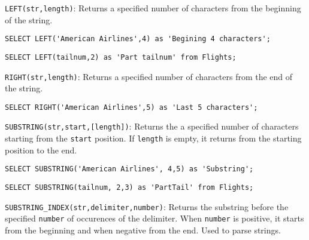 \documentclass{article}
\begin{document}
\begin{outline}

   \1 \texttt{LEFT(str,length)}: Returns a specified number of characters from the beginning of the  string.
        
         
\begin{lstlisting}[frame=single]  
SELECT LEFT('American Airlines',4) as 'Begining 4 characters';
\end{lstlisting}

        
\begin{lstlisting}[frame=single]  
SELECT LEFT(tailnum,2) as 'Part tailnum' from Flights;
\end{lstlisting}

         
         
         
         
         
   \1 \texttt{RIGHT(str,length)}: Returns a specified number of characters
from the end of the  string.

       
\begin{lstlisting}[frame=single]  
SELECT RIGHT('American Airlines',5) as 'Last 5 characters';
\end{lstlisting}





      
   \1 \texttt{SUBSTRING(str,start,[length])}: Returns the a specified number of characters starting from the \texttt{start} position.  If \texttt{length} is empty, it returns from the starting position to the end.    
       
\begin{lstlisting}[frame=single]  
SELECT SUBSTRING('American Airlines', 4,5) as 'Substring';
\end{lstlisting}


       
\begin{lstlisting}[frame=single]  
SELECT SUBSTRING(tailnum, 2,3) as 'PartTail' from Flights;
\end{lstlisting}

       

  
  
  
  
  
  
  
      
   \1 \texttt{SUBSTRING\_INDEX(str,delimiter,number)}: Returns  the substring before the specified \texttt{number} of occurences of the delimiter.  When \texttt{number} is positive, it starts from the beginning and when negative from the end. Used to parse strings. 
       

\end{outline}
\end{document}
